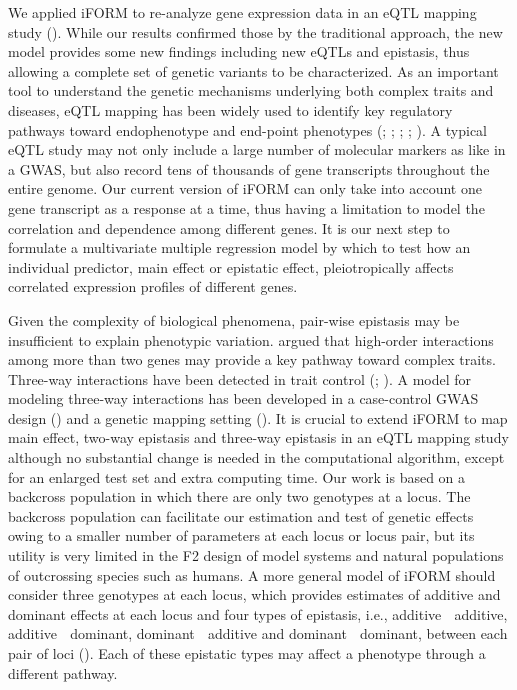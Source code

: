 \documentclass[]{book}
\theoremstyle{definition}
\theoremstyle{definition}
\theoremstyle{remark}
\begin{document}
We applied iFORM to re-analyze gene expression data in an eQTL mapping
study (\cite{rockman2010selection}). While our results confirmed those
by the traditional approach, the new model provides some new findings
including new eQTLs and epistasis, thus allowing a complete set of
genetic variants to be characterized. As an important tool to understand
the genetic mechanisms underlying both complex traits and diseases, eQTL
mapping has been widely used to identify key regulatory pathways toward
endophenotype and end-point phenotypes (\cite{schadt2005integrative};
\cite{emilsson2008genetics}; \cite{cookson2009mapping};
\cite{pickrell2010understanding}; \cite{nica2013expression}). A typical
eQTL study may not only include a large number of molecular markers as
like in a GWAS, but also record tens of thousands of gene transcripts
throughout the entire genome. Our current version of iFORM can only take
into account one gene transcript as a response at a time, thus having a
limitation to model the correlation and dependence among different
genes. It is our next step to formulate a multivariate multiple
regression model by which to test how an individual predictor, main
effect or epistatic effect, pleiotropically affects correlated
expression profiles of different genes.

Given the complexity of biological phenomena, pair-wise epistasis may be
insufficient to explain phenotypic variation.
\cite{imielinski2008exploiting} argued that high-order interactions
among more than two genes may provide a key pathway toward complex
traits. Three-way interactions have been detected in trait control
(\cite{mcmullen1998quantitative}; \cite{stich2007power}). A model for
modeling three-way interactions has been developed in a case-control
GWAS design (\cite{wang2010general}) and a genetic mapping setting
(\cite{pang2013statistical}). It is crucial to extend iFORM to map main
effect, two-way epistasis and three-way epistasis in an eQTL mapping
study although no substantial change is needed in the computational
algorithm, except for an enlarged test set and extra computing time. Our
work is based on a backcross population in which there are only two
genotypes at a locus. The backcross population can facilitate our
estimation and test of genetic effects owing to a smaller number of
parameters at each locus or locus pair, but its utility is very limited
in the F2 design of model systems and natural populations of outcrossing
species such as humans. A more general model of iFORM should consider
three genotypes at each locus, which provides estimates of additive and
dominant effects at each locus and four types of epistasis, i.e.,
additive  additive, additive  dominant, dominant  additive and
dominant  dominant, between each pair of loci
(\cite{kempthorne1968correlation}). Each of these epistatic types may
affect a phenotype through a different pathway.
\end{document}
